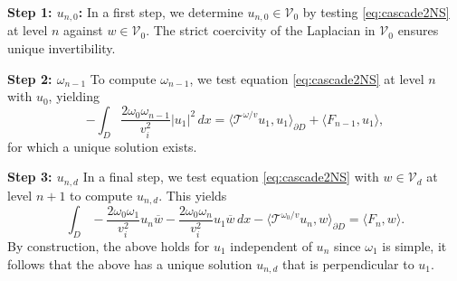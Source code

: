 \documentclass[a4paper,reqno,twoside]{amsart}
\numberwithin{equation}{section}
\theoremstyle{definition}
\newcommand{\<}{\ensuremath \leq}
\renewcommand{\>}{\ensuremath \geq}
\begin{document}
\textbf{Step 1: $u_{n,0}$:} In a first step, we determine $u_{n,0} \in \mathcal{V}_0$ by testing \eqref{eq:cascade2NS} at level $n$ against $w \in \mathcal{V}_0$. The strict coercivity of the Laplacian in $\mathcal{V}_0$ ensures unique invertibility.

\textbf{Step 2: $\omega_{n-1}$} To compute $\omega_{n-1}$, we test equation \eqref{eq:cascade2NS} at level $n$ with $u_0$, yielding
\begin{equation}
    -\int_{D} \frac{2\omega_0\omega_{n-1}}{v_i^2}\lvert u_{1}\rvert^2\, dx =\langle \mathcal{T}^{\omega/v}u_1,u_1\rangle_{\partial D} + \langle F_{n-1},u_1\rangle, 
\end{equation}
for which a unique solution exists.

\textbf{Step 3: $u_{n,d}$} In a final step, we test equation \eqref{eq:cascade2NS} with $w\in\mathcal{V}_d$ at level $n+1$ to compute $u_{n,d}$. This yields
\begin{equation}\label{eq:cascade3NS}
    \int_{D} 
    - \dfrac{2\omega_0\omega_1}{v_i^2}u_{n}\overline{w} - \frac{2\omega_0\omega_{n}}{v_i^2}u_1\overline{w}\, dx - \langle\mathcal{T}^{\omega_0/v}u_{n},w\rangle_{\partial D} =  \langle F_{n},w\rangle.
\end{equation}
By construction, the above holds for $u_1$ independent of $u_{n}$ since $\omega_1$ is simple, it follows that the above has a unique solution $u_{n,d}$ that is perpendicular to $u_1$.
\end{document}
